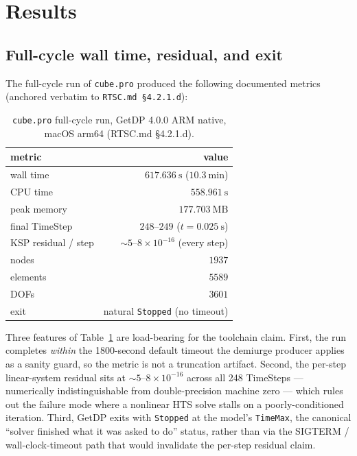 \documentclass[11pt,a4paper]{article}
\begin{document}
\section{Results}
\label{sec:results}

\subsection{Full-cycle wall time, residual, and exit}
\label{sec:results-full}

The full-cycle run of \texttt{cube.pro} produced the following
documented metrics (anchored verbatim to \texttt{RTSC.md \S4.2.1.d}):

\begin{table}[h]
\centering
\caption{\texttt{cube.pro} full-cycle run, GetDP 4.0.0 ARM native,
macOS arm64 (RTSC.md \S4.2.1.d).}
\label{tab:cube-metrics}
\begin{tabular}{lr}
\toprule
metric & value \\
\midrule
wall time           & $617.636~\mathrm{s}$ ($10.3~\mathrm{min}$) \\
CPU time            & $558.961~\mathrm{s}$ \\
peak memory         & $177.703~\mathrm{MB}$ \\
final TimeStep      & $248\text{--}249$ ($t = 0.025~\mathrm{s}$) \\
KSP residual / step & $\sim 5\text{--}8 \times 10^{-16}$ (every step) \\
nodes               & $1937$ \\
elements            & $5589$ \\
DOFs                & $3601$ \\
exit                & natural \texttt{Stopped} (no timeout) \\
\bottomrule
\end{tabular}
\end{table}

Three features of Table~\ref{tab:cube-metrics} are load-bearing for the
toolchain claim. First, the run completes \emph{within} the 1800-second
default timeout the demiurge producer applies as a sanity guard, so the
metric is not a truncation artifact. Second, the per-step linear-system
residual sits at $\sim 5\text{--}8 \times 10^{-16}$ across all 248
TimeSteps --- numerically indistinguishable from double-precision
machine zero --- which rules out the failure mode where a nonlinear
HTS solve stalls on a poorly-conditioned iteration. Third, GetDP exits
with \texttt{Stopped} at the model's \texttt{TimeMax}, the canonical
``solver finished what it was asked to do'' status, rather than via
the SIGTERM / wall-clock-timeout path that would invalidate the per-step
residual claim.
\end{document}

